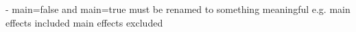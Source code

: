 

- main=false and main=true must be renamed to something meaningful e.g.
 main effects included
main effects excluded